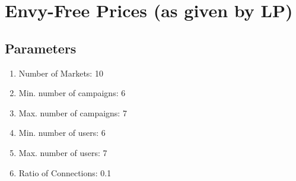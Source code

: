 \documentclass[12pt,letterpaper]{article}
\begin{document}


\section*{Envy-Free Prices (as given by LP)}
\subsection*{Parameters}
\begin{enumerate}
\item[] Number of Markets: 10
\item[] Min. number of campaigns: 6
\item[] Max. number of campaigns: 7
\item[] Min. number of users: 6
\item[] Max. number of users: 7
\item[] Ratio of Connections: 0.1
\end{enumerate}
\end{document}

